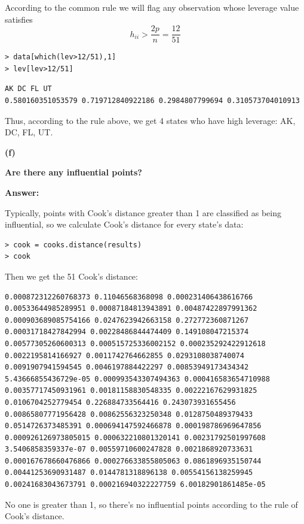 \documentclass[letterpaper,11pt]{article}
\begin{document}
According to the common rule we will flag any observation whose leverage value satisfies
$$h_{ii} > \frac{2p}{n} = \frac{12}{51}$$

\begin{lstlisting}
> data[which(lev>12/51),1]
> lev[lev>12/51]
\end{lstlisting}

\begin{lstlisting}
AK DC FL UT
0.580160351053579 0.719712840922186 0.2984807799694 0.310573704010913
\end{lstlisting}

Thus, according to the rule above, we get 4 states who have high leverage: AK, DC, FL, UT.

\begin{addmargin}[-1.1em]{0em}
  \textbf{(f)}\par
\end{addmargin}
\textbf{Are there any influential points?}\par
\bigbreak
\begin{addmargin}[-0.5em]{0em}
  \textbf{Answer: }
\end{addmargin}

Typically, points with Cook's distance greater than 1 are classified as being influential, so we calculate Cook's distance for every state's data:
\begin{lstlisting}
> cook = cooks.distance(results)
> cook
\end{lstlisting}
Then we get the 51 Cook's distance:
\begin{lstlisting}
0.000872312260768373 0.11046568368098 0.000231406438616766 0.00533644985289951 0.00087184813943891 0.00487422897991362 0.000903689085754166 0.0247623942663158 0.272772360871267 0.00031718427842994 0.00228486844474409 0.149108047215374 0.00577305260600313 0.000515725336002152 0.000235292422912618 0.0022195814166927 0.0011742764662855 0.0293108038740074 0.0091907941594545 0.0046197884422297 0.00853949173434342 5.43666855436729e-05 0.000993543307494363 0.000416583654710988 0.00357717450931961 0.00181158830548335 0.00222167629931825 0.0106704252779454 0.226884733564416 0.243073931655456 0.00865807771956428 0.00862556323250348 0.0128750489379433 0.0514726373485391 0.000694147592466878 0.000198786969647856 0.000926126973805015 0.000632210801320141 0.00231792501997608 3.5406858359337e-07 0.00559710600247828 0.0021868920733631 0.000167678660476866 0.000276633855805063 0.0861896935150744 0.00441253690931487 0.0144781318896138 0.00554156138259945 0.00241683043673791 0.000216940322227759 6.00182901861485e-05
\end{lstlisting}
No one is greater than 1, so there's no influential points according to the rule of Cook's distance.
\end{document}
